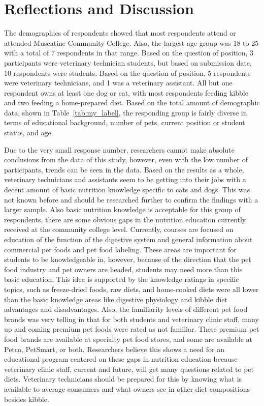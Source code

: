\section{Reflections and Discussion}
The demographics of respondents showed that most respondents attend or attended Muscatine Community College. Also, the largest age group was 18 to 25 with a total of 7 respondents in that range. Based on the question of position, 3 participants were veterinary technician students, but based on submission date, 10 respondents were students. Based on the question of position, 5 respondents were veterinary technicians, and 1 was a  veterinary assistant. All but one respondent owns at least one dog or cat, with most respondents feeding kibble and two feeding a home-prepared diet. Based on the total amount of demographic data, shown in Table~\ref{tab:my_label}, the responding group is fairly diverse in terms of educational background, number of pets, current position or student status, and age.
\par Due to the very small response number, researchers cannot make absolute conclusions from the data of this study, however, even with the low number of participants, trends can be seen in the data. Based on the results as a whole, veterinary technicians and assistants seem to be getting into their jobs with a decent amount of basic nutrition knowledge specific to cats and dogs. This was not known before and should be researched further to confirm the findings with a larger sample. Also basic nutrition knowledge is acceptable for this group of respondents, there are some obvious gaps in the nutrition education currently received at the community college level. Currently, courses are focused on education of the function of the digestive system and general information about commercial pet foods and pet food labeling. These areas are important for students to be knowledgeable in, however, because of the direction that the pet food industry and pet owners are headed, students may need more than this basic education. This idea is supported by the knowledge ratings in specific topics, such as freeze-dried foods, raw diets, and home-cooked diets were all lower than the basic knowledge areas like digestive physiology and kibble diet advantages and disadvantages. Also, the familiarity levels of different pet food brands was very telling in that for both students and veterinary clinic staff, many up and coming premium pet foods were rated as not familiar. These premium pet food brands are available at specialty pet food stores, and some are available at Petco, PetSmart, or both. Researchers believe this shows a need for an educational program centered on these gaps in nutrition education because veterinary clinic staff, current and future, will get many questions related to pet diets. Veterinary technicians should be prepared for this by knowing what is available to average consumers and what owners see in other diet compositions besides kibble.
